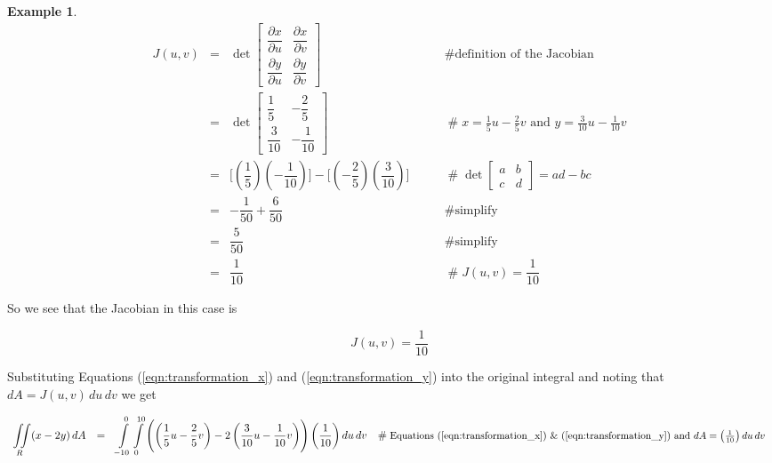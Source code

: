 \documentclass{article}
\theoremstyle{definition}
\newtheorem{example}{Example}[section]
\begin{document}
\begin{example}
\begin{equation*}
\begin{array}{lllll}
J(u,v) 
&=& \det
\begin{bmatrix}
  \dfrac{\partial x}{\partial u} & \dfrac{\partial x}{\partial v} \\[2ex]
  \dfrac{\partial y}{\partial u} & \dfrac{\partial y}{\partial v} 
\end{bmatrix} 
			&\qquad \mathrel{\#} \text{definition of the Jacobian} \\
[25pt]
&=& \det
\begin{bmatrix}
  \dfrac{1}{5}  & - \dfrac{2}{5} \\[2ex]
  \dfrac{3}{10} & - \dfrac{1}{10} 
\end{bmatrix} 
			&\qquad \mathrel{\#} x = \frac{1}{5} u - \frac{2}{5} v \text{ and } y = \frac{3}{10} u - \frac{1}{10} v \\
[25pt]
&=& \Bigg [\left(\dfrac{1}{5}\right )\left ( - \dfrac{1}{10}\right ) \Bigg ] 
 -  \Bigg [\left ( - \dfrac{2}{5} \right ) \left (\dfrac{3}{10}\right )  \Bigg ]
			&\qquad \mathrel{\#} \det \begin{bmatrix} a & b \\ c & d \end{bmatrix} = ad -bc \\
[15pt]
&=& - \dfrac{1}{50} + \dfrac{6}{50}
			&\qquad \mathrel{\#} \text{simplify} \\
[10pt]
&=& \dfrac{5}{50}
			&\qquad \mathrel{\#} \text{simplify} \\
[10pt]
&=& \dfrac{1}{10}
			&\qquad \mathrel{\#} J(u,v) = \dfrac{1}{10}

\end{array}
\end{equation*}

\bigskip
\noindent
So we see that the Jacobian in this case is

\begin{equation}
J(u,v) = \dfrac{1}{10}
\label{eqn:jacobian}
\end{equation}

\bigskip
\noindent
Substituting Equations (\ref{eqn:transformation_x}) and 
(\ref{eqn:transformation_y}) into the original  
integral and noting that $dA = J(u,v) \, du \, dv$ we 
get

\begin{equation*}
\begin{array}{lllll}
{\displaystyle \iint\limits_{R} (x - 2y) \, dA}
&=& {\displaystyle \int\limits_{-10}^{0} \int\limits_{0}^{10} \left ( \left (  \dfrac{1}{5}u - \dfrac{2}{5}v \right )
 -  2 \left( \dfrac{3}{10} u  - \dfrac{1}{10} v \right ) \right )}
 \left ( \dfrac{1}{10} \right ) du \, dv
			&\mathrel{\#} \text{\small Equations (\ref{eqn:transformation_x}) \& (\ref{eqn:transformation_y})
			and $dA = \left ( \frac{1}{10} \right ) du \, dv$}


\end{array}
\end{equation*}
\end{example}
\end{document}
